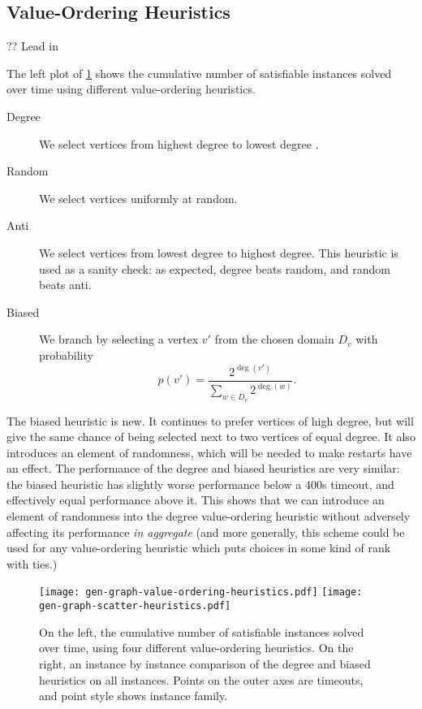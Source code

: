 \documentclass[runningheads]{llncs}
\begin{document}
\subsection{Value-Ordering Heuristics}

?? Lead in

The left plot of \cref{figure:value-ordering-heuristics} shows the cumulative number of satisfiable
instances solved over time using different value-ordering heuristics.

\begin{description}
\item[Degree] We select vertices from highest degree to lowest degree
\cite{DBLP:conf/ijcai/McCreeshPT16}.

\item[Random] We select vertices uniformly at random.

\item[Anti] We select vertices from lowest degree to highest degree. This heuristic is used as
a sanity check: as expected, degree beats random, and random beats anti.

\item[Biased] We branch by selecting a vertex $v'$ from the chosen domain $D_v$ with
probability \[ p(v') = \frac{2^{\deg(v')}}{\sum_{w \in D_v}{2^{\deg(w)}}} \text{.} \]\end{description}

\noindent
The biased heuristic is new. It continues to prefer vertices of high degree, but will give the same
chance of being selected next to two vertices of equal degree.  It also introduces an element of
randomness, which will be needed to make restarts have an effect.  The performance of the degree and
biased heuristics are very similar: the biased heuristic has slightly worse performance below a 400s
timeout, and effectively equal performance above it. This shows that we can introduce an element of
randomness into the degree value-ordering heuristic without adversely affecting its performance
\emph{in aggregate} (and more generally, this scheme could be used for any value-ordering
heuristic which puts choices in some kind of rank with ties.)

\begin{figure}[tb]
    \texttt{[image: gen-graph-value-ordering-heuristics.pdf]}
    \hfill
    \texttt{[image: gen-graph-scatter-heuristics.pdf]}

    \caption{On the left, the cumulative number of satisfiable instances solved over time, using
    four different value-ordering heuristics. On the right, an instance by instance comparison of
    the degree and biased heuristics on all instances. Points on the outer axes are timeouts, and
    point style shows instance family.}
    \label{figure:value-ordering-heuristics}
\end{figure}
\end{document}
